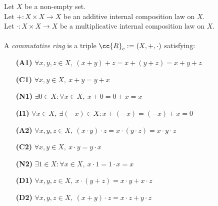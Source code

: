 \begin{definition-pre}
    \label{def:commutative_ring}
    Let $X$ be a non-empty set. \\
    Let $+: X\times X \to X$ be an additive internal composition law on $X$. \\
    Let $\cdot: X\times X \to X$ be a multiplicative internal composition law on $X$. \\\\
    A \textit{commutative ring} is a triple $\cc{R}_c:= (X, +, \cdot)$ satisfying:
    \begin{enumerate}
        \item [\textbf{(A1)}] $\forall x,y,z\in X,\ (x+y)+z= x+(y+z) = x+y+z$
        \item [\textbf{(C1)}] $\forall x,y\in X,\ x+y = y+x$
        \item [\textbf{(N1)}] $\exists 0 \in X : \forall x \in X,\ x+0 = 0+x = x$
        \item [\textbf{(I1)}] $\forall x \in X,\ \exists (-x)\in X: x+(-x) = (-x)+x = 0$
        \item [\textbf{(A2)}] $\forall x,y,z\in X,\ (x\cdot y)\cdot z= x\cdot(y\cdot z) = x\cdot y\cdot z$
        \item [\textbf{(C2)}] $\forall x,y\in X,\ x\cdot y = y\cdot x$
        \item [\textbf{(N2)}] $\exists 1 \in X : \forall x \in X,\ x\cdot1 = 1\cdot x = x$
        \item [\textbf{(D1)}] $\forall x,y,z \in X,\ x\cdot(y+z)=x\cdot y+x\cdot z$
        \item [\textbf{(D2)}] $\forall x,y,z \in X,\ (x+y)\cdot z=x\cdot z+y\cdot z$
    \end{enumerate}
\end{definition-pre}

